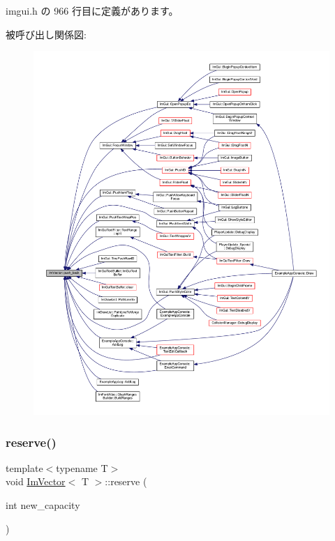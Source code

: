  imgui.\+h の 966 行目に定義があります。

被呼び出し関係図\+:\nopagebreak
\begin{figure}[H]
\begin{center}
\leavevmode
\includegraphics[width=350pt]{class_im_vector_a68387993f2a5f5c3b2a7139d9ab778b8_icgraph}
\end{center}
\end{figure}
\mbox{\label{class_im_vector_a0f14f5736c3372157856eebb67123b75}} 
\subsubsection{\texorpdfstring{reserve()}{reserve()}}
{\footnotesize\ttfamily template$<$typename T$>$ \\
void \mbox{\hyperlink{class_im_vector}{Im\+Vector}}$<$ T $>$\+::reserve (\begin{DoxyParamCaption}\item[{int}]{new\+\_\+capacity }\end{DoxyParamCaption})\hspace{0.3cm}{\ttfamily [inline]}}



